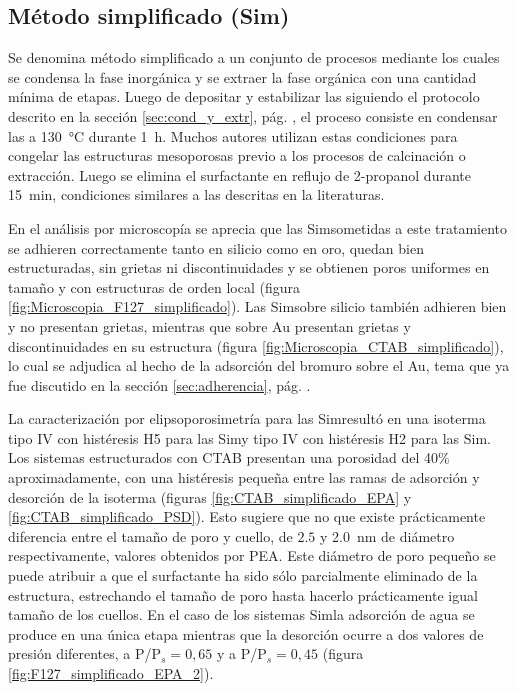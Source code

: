 	\subsection{Método simplificado (Sim)}

	 		Se denomina método simplificado a un conjunto de procesos mediante los cuales se condensa la fase inorgánica y se extraer la fase orgánica con una cantidad mínima de etapas. Luego de depositar y estabilizar las \pdm\space siguiendo el protocolo descrito en la sección \ref{sec:cond_y_extr}, pág. \pageref{sec:cond_y_extr}, el proceso consiste en condensar las \pdm\space a \SI{130}{\celsius} durante \SI{1}{\hour}. Muchos autores utilizan estas condiciones para congelar las estructuras mesoporosas previo a los procesos de calcinación o extracción. \cite{Crepaldi2003,Crepaldi2002a,Soler-Illia2006} Luego se elimina el surfactante en reflujo de 2-propanol durante \SI{15}{\minute}, condiciones similares a las descritas en la literaturas. \cite{Angelome2008,Calvo20210,Calvo2010,Fuertes2009,brunsen2011,Calvo2009}
			
			En el análisis por microscopía se aprecia que las Sim\pdmF\space sometidas a este tratamiento se adhieren correctamente tanto en silicio como en oro, quedan bien estructuradas, sin grietas ni discontinuidades y se obtienen poros uniformes en tamaño y con estructuras de orden local (figura \ref{fig:Microscopia_F127_simplificado}). Las Sim\pdmC\space sobre silicio también adhieren bien y no presentan grietas, mientras que sobre Au presentan grietas y discontinuidades en su estructura (figura \ref{fig:Microscopia_CTAB_simplificado}), lo cual se adjudica al hecho de la adsorción del bromuro sobre el Au, tema que ya fue discutido en la sección \ref{sec:adherencia}, pág. \pageref{sec:adherencia}. 
			
			La caracterización por elipsoporosimetría para las Sim\pdmF\space resultó en una isoterma tipo IV con histéresis H5 para las Sim\pdmC\space y tipo IV con histéresis H2 para las Sim\pdmF\cite{Thommes2015}. Los sistemas estructurados con CTAB presentan una porosidad del 40\% aproximadamente, con una histéresis pequeña entre las ramas de adsorción y desorción de la isoterma (figuras \ref{fig:CTAB_simplificado_EPA}  y \ref{fig:CTAB_simplificado_PSD}). Esto sugiere que no que existe prácticamente diferencia entre el tamaño de poro y cuello, de $2.5$ y \SI{2.0}{\nm} de diámetro respectivamente, valores obtenidos por PEA. Este diámetro de poro pequeño se puede atribuir a que el surfactante ha sido sólo parcialmente eliminado de la estructura, estrechando el tamaño de poro hasta hacerlo prácticamente igual tamaño de los cuellos. En el caso de los sistemas Sim\pdmF\space la adsorción de agua se produce en una única etapa mientras que la desorción ocurre a dos valores de presión diferentes, a P/P$_s=0,65$ y a P/P$_s=0,45$ (figura \ref{fig:F127_simplificado_EPA_2}). 

